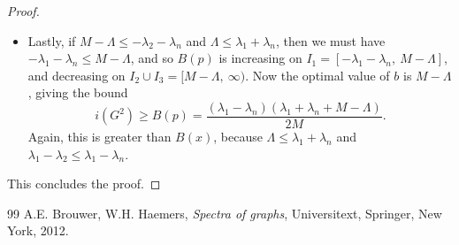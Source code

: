 \documentclass[10pt,a4paper]{amsart}
\theoremstyle{definition}
\begin{document}
\begin{proof}
\begin{itemize}
\begin{itemize}
            $$i(G^2)\ge B(p) = \frac{(\lambda_1-\lambda_2)(\lambda_1-\lambda_n)}{2(\Lambda-\lambda_2-\lambda_n)},$$
            which is again greater than $B(x)$ because $\Lambda<\lambda_1+\lambda_2$.
            \item Lastly, if $M-\Lambda \le -\lambda_2-\lambda_n$ and $\Lambda \le \lambda_1+\lambda_n$, then we must have $-\lambda_1-\lambda_n \le M-\Lambda$, and so $B(p)$ is increasing on $I_1=[-\lambda_1-\lambda_n,\ M-\Lambda]$, and decreasing on $I_2\cup I_3=[M-\Lambda,\ \infty)$. Now the optimal value of $b$ is $M-\Lambda$, giving the bound
            $$i(G^2)\ge B(p)=\frac{(\lambda_1-\lambda_n)(\lambda_1+\lambda_n+M-\Lambda)}{2M}.$$
            Again, this is greater than $B(x)$, because $\Lambda\le \lambda_1+\lambda_n$ and $\lambda_1-\lambda_2 \le \lambda_1-\lambda_n$.
    \end{itemize}
    \end{itemize}
    This concludes the proof.
\end{proof}

\begin{thebibliography}{99}
 A.E. Brouwer, W.H. Haemers, \emph{Spectra of graphs}, Universitext, Springer, New York, 2012. 
\end{thebibliography}
\end{document}
